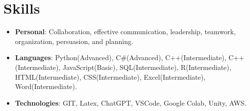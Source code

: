 \documentclass[letterpaper, 10pt]{article}
\newcommand{\resumeSubHeadingListStart}{\begin{itemize}[leftmargin=*]}
\newcommand{\resumeSubHeadingListEnd}{\end{itemize}}
\begin{document}
\section{Skills}
    \resumeSubHeadingListStart
        \item {
            \textbf{Personal}{: Collaboration, effective communication, leadership, teamwork, organization, persuasion, and planning.}
        }
        \item{
            \textbf{Languages}{: Python(Advanced), C\#(Advanced), C++(Intermediate), C++(Intermediate), JavaScript(Basic), SQL(Intermediate), R(Intermediate), HTML(Intermediate), CSS(Intermediate), Excel(Intermediate), Word(Intermediate).}
        }
        \item {
            \textbf{Technologies}{: GIT, Latex, ChatGPT, VSCode, Google Colab, Unity, AWS.}
        }
    \resumeSubHeadingListEnd


\end{document}
